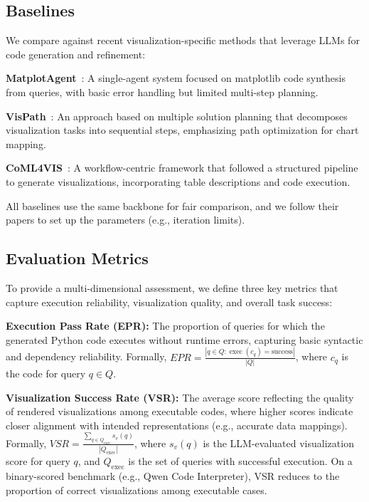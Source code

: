 \subsection{Baselines}
We compare \methodname{} against recent visualization-specific methods that leverage LLMs for code generation and refinement:

\textbf{MatplotAgent}~\citep{yang2024matplotagent}: A single-agent system focused on matplotlib code synthesis from queries, with basic error handling but limited multi-step planning.

\textbf{VisPath}~\citep{seo2025automated}: An approach based on multiple solution planning that decomposes visualization tasks into sequential steps, emphasizing path optimization for chart mapping.

\textbf{CoML4VIS}~\citep{chen2024viseval}: A workflow-centric framework that followed a structured pipeline to generate visualizations, incorporating table descriptions and code execution.


All baselines use the same  backbone for fair comparison, and we follow their papers to set up the parameters (e.g., iteration limits).

\subsection{Evaluation Metrics}
To provide a multi-dimensional assessment, we define three key metrics that capture execution reliability, visualization quality, and overall task success:

\textbf{Execution Pass Rate (EPR):} The proportion of queries for which the generated Python code executes without runtime errors, capturing basic syntactic and dependency reliability. Formally, $EPR = \frac{|{q \in Q : \operatorname{exec}(c_q) = \text{success}}|}{|Q|}$, where $c_q$ is the code for query $q \in Q$. 

\textbf{Visualization Success Rate (VSR):} The average score reflecting the quality of rendered visualizations among executable codes, where higher scores indicate closer alignment with intended representations (e.g., accurate data mappings). Formally, $VSR = \frac{\sum_{q \in Q_{\text{exec}}} s_v(q)}{|Q_{\text{exec}}|}$, where $s_v(q)$ is the LLM-evaluated visualization score for query $q$, and $Q_{\text{exec}}$ is the set of queries with successful execution. On a binary-scored benchmark (e.g., Qwen Code Interpreter), VSR reduces to the proportion of correct visualizations among executable cases.

